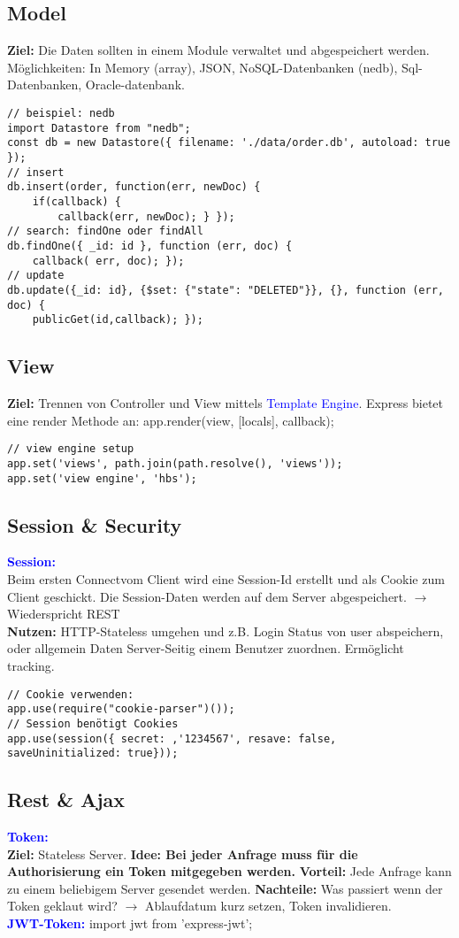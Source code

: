 \subsection{Model}
\textbf{Ziel:} Die Daten sollten in einem Module verwaltet und abgespeichert werden. Möglichkeiten: In Memory (array), JSON, NoSQL-Datenbanken (nedb), Sql-Datenbanken, Oracle-datenbank.
\begin{lstlisting}[style=htmlcssjs]
// beispiel: nedb
import Datastore from "nedb";
const db = new Datastore({ filename: './data/order.db', autoload: true });
// insert
db.insert(order, function(err, newDoc) {
    if(callback) {
        callback(err, newDoc); } });
// search: findOne oder findAll
db.findOne({ _id: id }, function (err, doc) {
    callback( err, doc); });
// update
db.update({_id: id}, {$set: {"state": "DELETED"}}, {}, function (err, doc) {
    publicGet(id,callback); });
\end{lstlisting}
\subsection{View}
\textbf{Ziel:} Trennen von Controller und View mittels \textcolor{blue}{Template Engine}. Express bietet eine render Methode an: app.render(view, [locals], callback);
\begin{lstlisting}[style=htmlcssjs]
// view engine setup
app.set('views', path.join(path.resolve(), 'views'));
app.set('view engine', 'hbs');
\end{lstlisting}
\subsection{Session \& Security}
\textbf{\textcolor{blue}{Session:}}\\
Beim ersten \dq Connect\dq vom Client wird eine Session-Id erstellt und als Cookie zum Client geschickt. Die Session-Daten werden auf dem Server abgespeichert. $\rightarrow$ Wiederspricht REST\\
\textbf{Nutzen:} HTTP-Stateless umgehen und z.B. Login Status von user abspeichern, oder allgemein Daten Server-Seitig einem Benutzer zuordnen. Ermöglicht tracking.
\begin{lstlisting}[style=htmlcssjs]
// Cookie verwenden:
app.use(require("cookie-parser")());
// Session benötigt Cookies
app.use(session({ secret: ‚'1234567', resave: false, saveUninitialized: true}));
\end{lstlisting}
\subsection{Rest \& Ajax}
\textbf{\textcolor{blue}{Token:}}\\
\textbf{Ziel:} Stateless Server. \textbf{Idee: Bei jeder Anfrage muss für die Authorisierung ein Token mitgegeben werden.} \textbf{Vorteil:} Jede Anfrage kann zu einem beliebigem Server gesendet werden. \textbf{Nachteile:} Was passiert wenn der Token geklaut wird? $\rightarrow$ Ablaufdatum kurz setzen, Token invalidieren.\\
\textbf{\textcolor{blue}{JWT-Token:}} import jwt from 'express-jwt';
